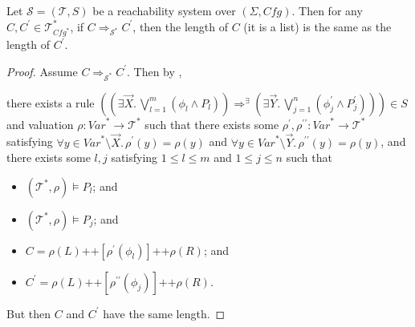 \documentclass{article}
\newenvironment{proofenv}
  {
    \VerbatimEnvironment\begin{tcolorbox}[colback=black!0!white] %
  }
  {
   \end{tcolorbox}
  }
\begin{document}
\begin{lemma}\label{lem:transitionOnlyBetweenListsOfSameLength}
    Let $\mathcal{S} = (\mathcal{T}, S)$ be a reachability system over $(\Sigma, \mathit{Cfg})$.
    Then for any $C,C^\prime \in \mathcal{T}^*_{\mathit{Cfg}^*}$,
    if $C \Rightarrow_{\mathcal{S}^*} C^\prime$,
    then the length of $C$ (it is a list) is the same as the length of $C^\prime$.
\end{lemma}
\begin{proof}
Assume $C \Rightarrow_{\mathcal{S}^*} C^\prime$.
Then by ,
\begin{proofenv}
    there exists a rule $((\exists \vec{X}.\, \bigvee_{l=1}^{m} (\phi_l \land P_l)) \Rightarrow^\exists (\exists \vec{Y}.\,     \bigvee_{j=1}^{n} (\phi^\prime_j \land P^\prime_j))) \in S$
    and valuation $\rho : \mathit{Var}^* \to \mathcal{T}^*$ such that
    there exists some $\rho^\prime,\rho^{\prime\prime} : \mathit{Var}^* \to \mathcal{T}^*$
    satisfying $\forall y \in \mathit{Var}^* \setminus \vec{X}.\, \rho^\prime(y) = \rho(y)$
    and $\forall y \in \mathit{Var}^* \setminus \vec{Y}.\, \rho^{\prime\prime}(y) = \rho(y)$,
    and there exists some $l,j$ satisfying $1 \leq l \leq m$ and $1 \leq j \leq n$ such that
    \begin{itemize}
        \item $(\mathcal{T}^*, \rho) \vDash P_l$; and
        \item $(\mathcal{T}^*, \rho) \vDash P_j$; and
        \item $C = \rho(L) \texttt{++} [\rho^\prime(\phi_l)] \texttt{++} \rho(R)$; and
        \item $C^\prime = \rho(L) \texttt{++} [\rho^{\prime\prime}(\phi_j)] 
        \texttt{++} \rho(R)$.
    \end{itemize}
\end{proofenv}
But then $C$ and $C^\prime$ have the same length.
\end{proof}
\end{document}
